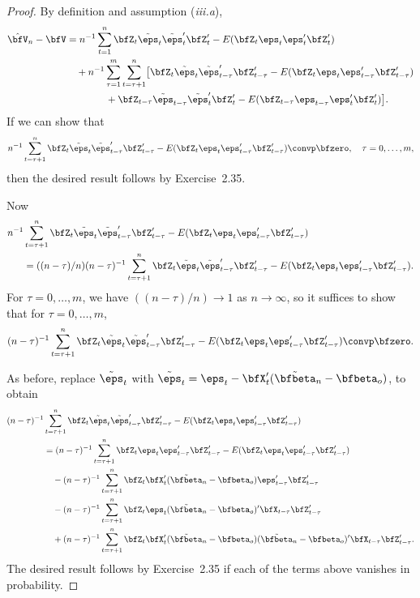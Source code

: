 \begin{proof}
By definition and assumption (\textit{iii.a}),
\begin{align*}
  \hat{\bfV}_n - \bfV &= n^{-1}\sum_{t=1}^{n}\bfZ_t\tilde{\eps}_t\tilde{\eps}_t'\bfZ_t' - E(\bfZ_t\eps_t\eps_t'\bfZ_t') \\
    &\quad + n^{-1}\sum_{\tau=1}^{m}\sum_{t=\tau+1}^{n}\bigl[\bfZ_t\tilde{\eps}_t\tilde{\eps}_{t-\tau}'\bfZ_{t-\tau}' - E(\bfZ_t\eps_t\eps_{t-\tau}'\bfZ_{t-\tau}') \\
    &\qquad\qquad + \bfZ_{t-\tau}\tilde{\eps}_{t-\tau}\tilde{\eps}_t'\bfZ_t' - E(\bfZ_{t-\tau}\eps_{t-\tau}\eps_t'\bfZ_t')\bigr].
\end{align*}
If we can show that
\[
  n^{-1}\sum_{t=\tau+1}^{n}\bfZ_t\tilde{\eps}_t\tilde{\eps}_{t-\tau}'\bfZ_{t-\tau}' - E(\bfZ_t\eps_t\eps_{t-\tau}'\bfZ_{t-\tau}') \convp \bfzero, \quad \tau = 0,\ldots,m,
\]
then the desired result follows by Exercise~2.35.

Now
\begin{align*}
  n^{-1}&\sum_{t=\tau+1}^{n}\bfZ_t\tilde{\eps}_t\tilde{\eps}_{t-\tau}'\bfZ_{t-\tau}' - E(\bfZ_t\eps_t\eps_{t-\tau}'\bfZ_{t-\tau}') \\
  &= ((n-\tau)/n)(n-\tau)^{-1}\sum_{t=\tau+1}^{n}\bfZ_t\tilde{\eps}_t\tilde{\eps}_{t-\tau}'\bfZ_{t-\tau}' - E(\bfZ_t\eps_t\eps_{t-\tau}'\bfZ_{t-\tau}').
\end{align*}
For $\tau = 0,\ldots,m$, we have $((n-\tau)/n) \to 1$ as $n \to \infty$, so it suffices to show that for $\tau = 0,\ldots,m$,
\[
  (n-\tau)^{-1}\sum_{t=\tau+1}^{n}\bfZ_t\tilde{\eps}_t\tilde{\eps}_{t-\tau}'\bfZ_{t-\tau}' - E(\bfZ_t\eps_t\eps_{t-\tau}'\bfZ_{t-\tau}') \convp \bfzero.
\]

As before, replace $\tilde{\eps}_t$ with $\tilde{\eps}_t = \eps_t - \bfX_t'(\tilde{\bfbeta}_n - \bfbeta_o)$, to obtain
\begin{align*}
  (n-\tau)^{-1}&\sum_{t=\tau+1}^{n}\bfZ_t\tilde{\eps}_t\tilde{\eps}_{t-\tau}'\bfZ_{t-\tau}' - E(\bfZ_t\eps_t\eps_{t-\tau}'\bfZ_{t-\tau}') \\
  &= (n-\tau)^{-1}\sum_{t=\tau+1}^{n}\bfZ_t\eps_t\eps_{t-\tau}'\bfZ_{t-\tau}' - E(\bfZ_t\eps_t\eps_{t-\tau}'\bfZ_{t-\tau}') \\
  &\quad - (n-\tau)^{-1}\sum_{t=\tau+1}^{n}\bfZ_t\bfX_t'(\tilde{\bfbeta}_n - \bfbeta_o)\eps_{t-\tau}'\bfZ_{t-\tau}' \\
  &\quad - (n-\tau)^{-1}\sum_{t=\tau+1}^{n}\bfZ_t\eps_t(\tilde{\bfbeta}_n - \bfbeta_o)'\bfX_{t-\tau}\bfZ_{t-\tau}' \\
  &\quad + (n-\tau)^{-1}\sum_{t=\tau+1}^{n}\bfZ_t\bfX_t'(\tilde{\bfbeta}_n - \bfbeta_o)(\tilde{\bfbeta}_n - \bfbeta_o)'\bfX_{t-\tau}\bfZ_{t-\tau}'.
\end{align*}
The desired result follows by Exercise~2.35 if each of the terms above vanishes in probability.


\end{proof}
